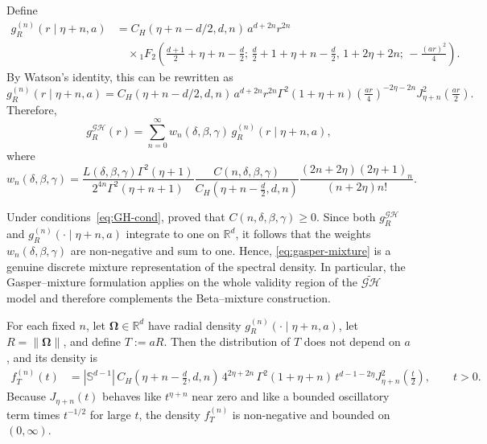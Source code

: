 \documentclass[
  12pt]{article}
\begin{document}
Define
\begin{equation}
\label{eq:holeeffectdensity}
\begin{split}
g^{(n)}_R\!\left(r \mid \eta+n,a\right)
&= C_H(\eta+n-d/2,d,n)\, a^{d+2n} r^{2n} \\
&\quad \times
{}_1F_2\!\left(
\tfrac{d+1}{2}+\eta+n-\tfrac d2;\,
\tfrac d2+1+\eta+n-\tfrac d2,\,
1+2\eta+2n;\,
-\tfrac{(ar)^2}{4}
\right).
\end{split}
\end{equation}
By Watson's identity, this can be rewritten as
\begin{equation}
\label{eq:holeeffectdensity-bessel}
g^{(n)}_R\!\left(r \mid \eta+n,a\right)
=
C_H(\eta+n-d/2,d,n)\, a^{d+2n} r^{2n}
\Gamma^2(1+\eta+n)
\left(\tfrac{ar}{4}\right)^{-2\eta-2n}
J^2_{\eta+n}\!\left(\tfrac{ar}{2}\right).
\end{equation}
Therefore,
\begin{equation}
\label{eq:gasper-mixture}
g_R^{\mathcal{GH}}(r)
=
\sum_{n=0}^{\infty}
w_n(\delta,\beta,\gamma)\,
g^{(n)}_R\!\left(r \mid \eta+n,a\right),
\end{equation}
where
\begin{equation}\label{polo}
w_n(\delta,\beta,\gamma)
=
\frac{L(\delta,\beta,\gamma)\Gamma^2(\eta+1)}{2^{4n}\Gamma^2(\eta+n+1)}
\frac{C(n,\delta,\beta,\gamma)}{C_H(\eta+n-\frac d2,d,n)}
\frac{(2n+2\eta)(2\eta+1)_n}{(n+2\eta)n!}.
\end{equation}

Under conditions~\eqref{eq:GH-cond}, \citet[Lemma~3.1]{cho2020rational} proved that
$C(n,\delta,\beta,\gamma)\ge 0$.
Since both $g_R^{\mathcal{GH}}$ and $g_R^{(n)}(\cdot\mid\eta+n,a)$ integrate to one on $\mathbb{R}^d$,
it follows that the weights $w_n(\delta,\beta,\gamma)$ are non-negative and sum to one.
Hence, \eqref{eq:gasper-mixture} is a genuine discrete mixture representation of the spectral density.
In particular, the Gasper--mixture formulation applies on the whole validity region of the $\widetilde{\mathcal{GH}}$ model and therefore complements the Beta--mixture construction.

For each fixed $n$, let $\boldsymbol{\Omega}\in\mathbb{R}^d$ have radial density
$g_R^{(n)}(\cdot\mid\eta+n,a)$, let $R=\|\boldsymbol{\Omega}\|$, and define $T:=aR$.
Then the distribution of $T$ does not depend on $a$, and its density is
\begin{equation}\label{eq:fT-holeeffect}
\begin{aligned}
f_T^{(n)}(t)
&=
|\mathbb{S}^{d-1}|\,
C_H(\eta+n-\tfrac d2,d,n)\,
4^{2\eta+2n}\,
\Gamma^2(1+\eta+n)\,
t^{d-1-2\eta}
J^2_{\eta+n}\!\left(\tfrac{t}{2}\right),
\qquad t>0.
\end{aligned}
\end{equation}
Because $J_{\eta+n}(t)$ behaves like $t^{\eta+n}$ near zero and like a bounded oscillatory term times $t^{-1/2}$ for large $t$, the density $f_T^{(n)}$ is non-negative and bounded on $(0,\infty)$.
\end{document}
